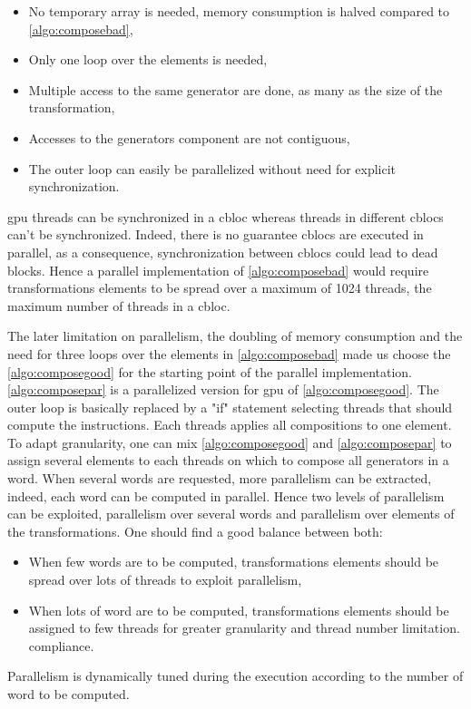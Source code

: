 {\begin{itemize}
 \item No temporary array is needed, memory consumption is halved compared to \autoref{algo:composebad},
 \item Only one loop over the elements is needed,
 \item Multiple access to the same generator are done, as many as the size of the transformation,
 \item Accesses to the generators component are not contiguous,
 \item The outer loop can easily be parallelized without need for explicit synchronization.
\end{itemize}
\gls{gpu} threads can be synchronized in a \gls{cbloc} whereas threads in different \glspl{cbloc} can't be synchronized. Indeed, there is no guarantee \glspl{cbloc} are executed in parallel, as a consequence, synchronization between \glspl{cbloc} could lead to dead blocks. Hence a parallel implementation of \autoref{algo:composebad} would require transformations elements to be spread over a maximum of 1024 threads, the maximum number of threads in a \gls{cbloc}.

The later limitation on parallelism, the doubling of memory consumption and the need for three loops over the elements in \autoref{algo:composebad} made us choose the \autoref{algo:composegood} for the starting point of the parallel implementation.
\autoref{algo:composepar} is a parallelized version for \gls{gpu} of \autoref{algo:composegood}. The outer loop is basically replaced by a "if" statement selecting threads that should compute the instructions. Each threads applies all compositions to one element. To adapt granularity, one can mix \autoref{algo:composegood} and \autoref{algo:composepar} to assign several elements to each threads on which to compose all generators in a word.
When several words are requested, more parallelism can be extracted, indeed, each word can be computed in parallel. Hence two levels of parallelism can be exploited, parallelism over several words and parallelism over elements of the transformations. One should find a good balance between both:
\begin{itemize}
\item When few words are to be computed, transformations elements should be spread over lots of threads to exploit parallelism,
\item When lots of word are to be computed, transformations elements should be assigned to few threads for greater granularity and thread number limitation. compliance.
\end{itemize}
Parallelism is dynamically tuned during the execution according to the number of word to be computed.



}
